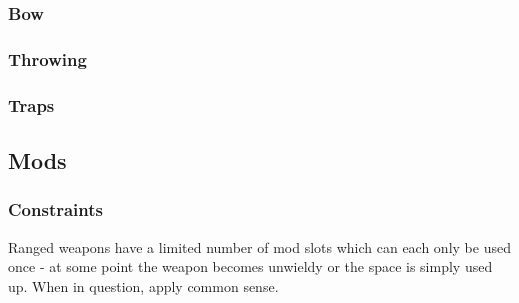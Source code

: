 \pagebreak
\subsubsection{Bow}
\vspace{8mm}
\begin{multicols}{2}
\end{multicols}

\hrulefill
\subsubsection{Throwing}
\vspace{8mm}
\begin{multicols}{2}
\end{multicols}

\hrulefill
\subsubsection{Traps}
\vspace{8mm}
\begin{multicols}{2}
\end{multicols}

\pagebreak %
\subsection{Mods}
\subsubsection{Constraints}
Ranged weapons have a limited number of mod slots which can each only be used once - at some point the weapon becomes unwieldy or the space is simply used up. When in question, apply common sense.\par\vspace{10mm}

